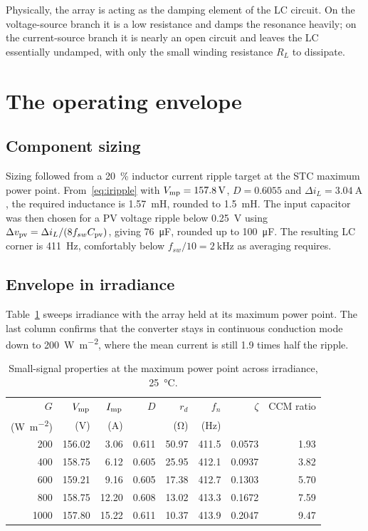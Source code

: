 Physically, the array is acting as the damping element of the LC circuit. On the
voltage-source branch it is a low resistance and damps the resonance heavily; on
the current-source branch it is nearly an open circuit and leaves the LC
essentially undamped, with only the small winding resistance $R_L$ to dissipate.

\section{The operating envelope}
\label{sec:sizing}

\subsection{Component sizing}

Sizing followed from a \SI{20}{\percent} inductor current ripple target at the
STC maximum power point. From~\eqref{eq:iripple} with $V_{\mathrm{mp}} = \SI{157.8}{\volt}$,
$D = \num{0.6055}$ and $\Delta i_L = \SI{3.04}{\ampere}$, the required inductance
is \SI{1.57}{\milli\henry}, rounded to \SI{1.5}{\milli\henry}. The input
capacitor was then chosen for a PV voltage ripple below \SI{0.25}{\volt} using
$\Delta v_{\mathrm{pv}} = \Delta i_L / (8 f_{sw} C_{\mathrm{pv}})$, giving
\SI{76}{\micro\farad}, rounded up to \SI{100}{\micro\farad}. The resulting LC
corner is \SI{411}{\hertz}, comfortably below $f_{sw}/10 = \SI{2}{\kilo\hertz}$
as averaging requires.

\subsection{Envelope in irradiance}

Table~\ref{tab:envG} sweeps irradiance with the array held at its maximum power
point. The last column confirms that the converter stays in continuous
conduction mode down to \SI{200}{\watt\per\square\metre}, where the mean current
is still \num{1.9} times half the ripple.

\begin{table}[htbp]
\centering
\caption{Small-signal properties at the maximum power point across irradiance, \SI{25}{\celsius}.}
\label{tab:envG}
\begin{tabular}{@{}rrrrrrrr@{}}
\toprule
$G$ & $V_{\mathrm{mp}}$ & $I_{\mathrm{mp}}$ & $D$ & $r_d$ & $f_n$ & $\zeta$ & CCM ratio \\
(\si{\watt\per\square\metre}) & (\si{\volt}) & (\si{\ampere}) & & (\si{\ohm}) & (\si{\hertz}) & & \\
\midrule
200  & 156.02 & 3.06  & 0.611 & 50.97 & 411.5 & 0.0573 & 1.93 \\
400  & 158.75 & 6.12  & 0.605 & 25.95 & 412.1 & 0.0937 & 3.82 \\
600  & 159.21 & 9.16  & 0.605 & 17.38 & 412.7 & 0.1303 & 5.70 \\
800  & 158.75 & 12.20 & 0.608 & 13.02 & 413.3 & 0.1672 & 7.59 \\
1000 & 157.80 & 15.22 & 0.611 & 10.37 & 413.9 & 0.2047 & 9.47 \\
\bottomrule
\end{tabular}
\end{table}

